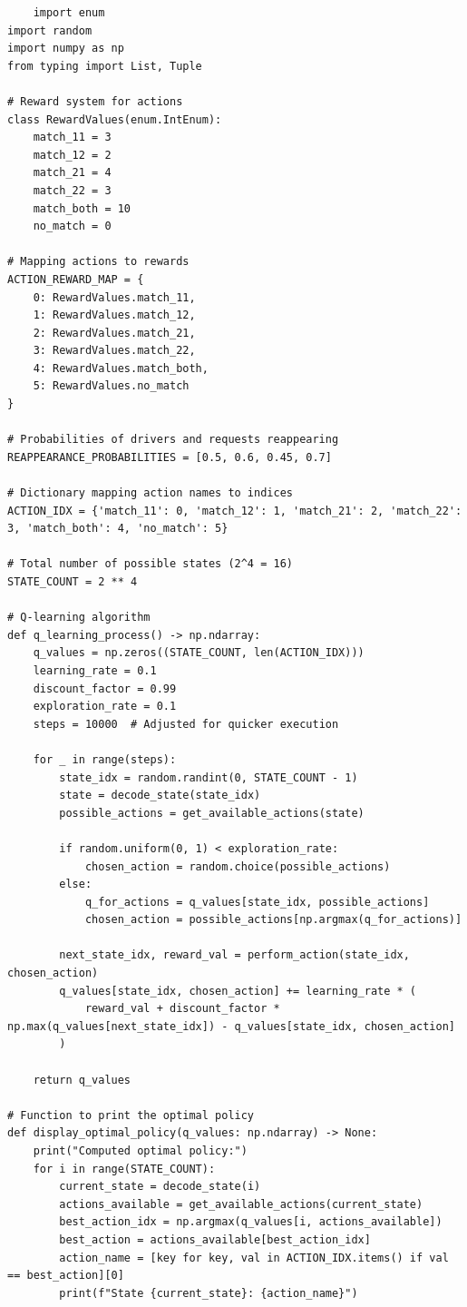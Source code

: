 \documentclass[letter,11pt]{article}
\begin{document}
\begin{lstlisting}
    import enum
import random
import numpy as np
from typing import List, Tuple

# Reward system for actions
class RewardValues(enum.IntEnum):
    match_11 = 3
    match_12 = 2
    match_21 = 4
    match_22 = 3
    match_both = 10
    no_match = 0

# Mapping actions to rewards
ACTION_REWARD_MAP = {
    0: RewardValues.match_11,
    1: RewardValues.match_12,
    2: RewardValues.match_21,
    3: RewardValues.match_22,
    4: RewardValues.match_both,
    5: RewardValues.no_match
}

# Probabilities of drivers and requests reappearing
REAPPEARANCE_PROBABILITIES = [0.5, 0.6, 0.45, 0.7]

# Dictionary mapping action names to indices
ACTION_IDX = {'match_11': 0, 'match_12': 1, 'match_21': 2, 'match_22': 3, 'match_both': 4, 'no_match': 5}

# Total number of possible states (2^4 = 16)
STATE_COUNT = 2 ** 4

# Q-learning algorithm
def q_learning_process() -> np.ndarray:
    q_values = np.zeros((STATE_COUNT, len(ACTION_IDX)))
    learning_rate = 0.1
    discount_factor = 0.99
    exploration_rate = 0.1
    steps = 10000  # Adjusted for quicker execution

    for _ in range(steps):
        state_idx = random.randint(0, STATE_COUNT - 1)
        state = decode_state(state_idx)
        possible_actions = get_available_actions(state)

        if random.uniform(0, 1) < exploration_rate:
            chosen_action = random.choice(possible_actions)
        else:
            q_for_actions = q_values[state_idx, possible_actions]
            chosen_action = possible_actions[np.argmax(q_for_actions)]

        next_state_idx, reward_val = perform_action(state_idx, chosen_action)
        q_values[state_idx, chosen_action] += learning_rate * (
            reward_val + discount_factor * np.max(q_values[next_state_idx]) - q_values[state_idx, chosen_action]
        )

    return q_values

# Function to print the optimal policy
def display_optimal_policy(q_values: np.ndarray) -> None:
    print("Computed optimal policy:")
    for i in range(STATE_COUNT):
        current_state = decode_state(i)
        actions_available = get_available_actions(current_state)
        best_action_idx = np.argmax(q_values[i, actions_available])
        best_action = actions_available[best_action_idx]
        action_name = [key for key, val in ACTION_IDX.items() if val == best_action][0]
        print(f"State {current_state}: {action_name}")


\end{lstlisting}
\end{document}
